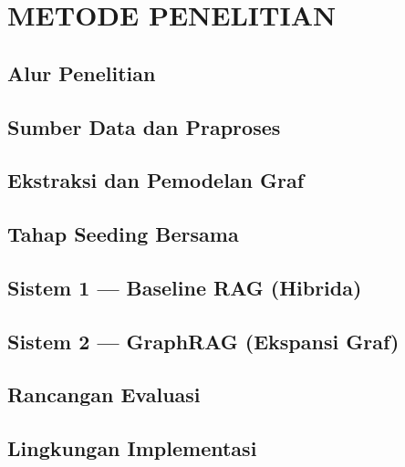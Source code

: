 \chapter{METODE PENELITIAN}
\label{bab:metode}

\section{Alur Penelitian}

\section{Sumber Data dan Praproses}

\section{Ekstraksi dan Pemodelan Graf}

\section{Tahap Seeding Bersama}

\section{Sistem 1 --- Baseline RAG (Hibrida)}

\section{Sistem 2 --- GraphRAG (Ekspansi Graf)}

\section{Rancangan Evaluasi}

\section{Lingkungan Implementasi}
